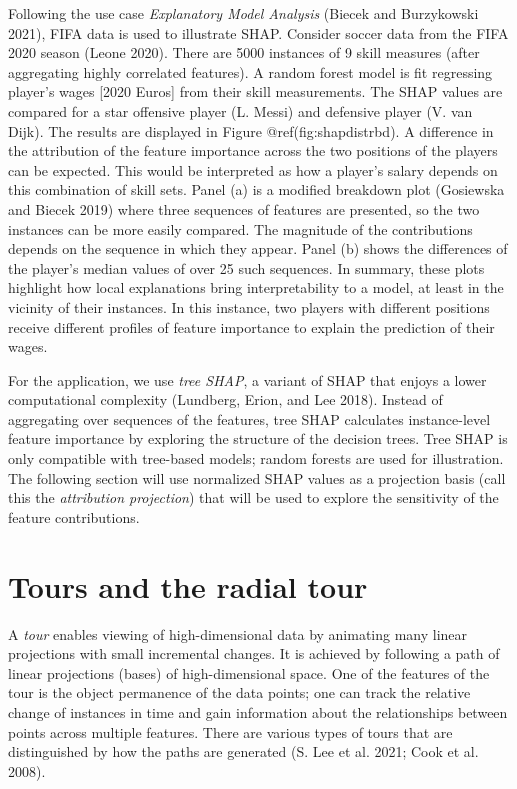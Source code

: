 \documentclass[
]{article}
\begin{document}
Following the use case \emph{Explanatory Model Analysis} (Biecek and
Burzykowski 2021), FIFA data is used to illustrate SHAP. Consider soccer
data from the FIFA 2020 season (Leone 2020). There are 5000 instances of
9 skill measures (after aggregating highly correlated features). A
random forest model is fit regressing player's wages {[}2020 Euros{]}
from their skill measurements. The SHAP values are compared for a star
offensive player (L. Messi) and defensive player (V. van Dijk). The
results are displayed in Figure @ref(fig:shapdistrbd). A difference in
the attribution of the feature importance across the two positions of
the players can be expected. This would be interpreted as how a player's
salary depends on this combination of skill sets. Panel (a) is a
modified breakdown plot (Gosiewska and Biecek 2019) where three
sequences of features are presented, so the two instances can be more
easily compared. The magnitude of the contributions depends on the
sequence in which they appear. Panel (b) shows the differences of the
player's median values of over 25 such sequences. In summary, these
plots highlight how local explanations bring interpretability to a
model, at least in the vicinity of their instances. In this instance,
two players with different positions receive different profiles of
feature importance to explain the prediction of their wages.

For the application, we use \emph{tree SHAP}, a variant of SHAP that
enjoys a lower computational complexity (Lundberg, Erion, and Lee 2018).
Instead of aggregating over sequences of the features, tree SHAP
calculates instance-level feature importance by exploring the structure
of the decision trees. Tree SHAP is only compatible with tree-based
models; random forests are used for illustration. The following section
will use normalized SHAP values as a projection basis (call this the
\emph{attribution projection}) that will be used to explore the
sensitivity of the feature contributions.

\hypertarget{sec:tour}{%
\section{Tours and the radial tour}\label{sec:tour}}

A \emph{tour} enables viewing of high-dimensional data by animating many
linear projections with small incremental changes. It is achieved by
following a path of linear projections (bases) of high-dimensional
space. One of the features of the tour is the object permanence of the
data points; one can track the relative change of instances in time and
gain information about the relationships between points across multiple
features. There are various types of tours that are distinguished by how
the paths are generated (S. Lee et al. 2021; Cook et al. 2008).
\end{document}
